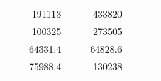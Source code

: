 \begin{table}[H]
\begin{tabular}{|ccrccrccc}
\multicolumn{1}{|c|}{\cellcolor[HTML]{FFFFC7}}                                & \multicolumn{1}{c|}{\cellcolor[HTML]{DDFDFF}}                      & \multicolumn{1}{r|}{\cellcolor[HTML]{DAE8FC}191113}    & \multicolumn{1}{c|}{\cellcolor[HTML]{FFFFC7}}                                & \multicolumn{1}{c|}{\cellcolor[HTML]{DDFDFF}}                       & \multicolumn{1}{r|}{\cellcolor[HTML]{DDFDFF}433820}    &                                                                              &                                                                    &                                                        \\ \cline{3-3} \cline{6-6}
\multicolumn{1}{|c|}{\cellcolor[HTML]{FFFFC7}}                                & \multicolumn{1}{c|}{\cellcolor[HTML]{DDFDFF}}                      & \multicolumn{1}{r|}{\cellcolor[HTML]{DDFDFF}100325}    & \multicolumn{1}{c|}{\cellcolor[HTML]{FFFFC7}}                                & \multicolumn{1}{c|}{\cellcolor[HTML]{DDFDFF}}                       & \multicolumn{1}{r|}{\cellcolor[HTML]{DAE8FC}273505}    &                                                                              &                                                                    &                                                        \\ \cline{3-3} \cline{6-6}
\multicolumn{1}{|c|}{\cellcolor[HTML]{FFFFC7}}                                & \multicolumn{1}{c|}{\cellcolor[HTML]{DDFDFF}}                      & \multicolumn{1}{r|}{\cellcolor[HTML]{DAE8FC}64331.4}   & \multicolumn{1}{c|}{\cellcolor[HTML]{FFFFC7}}                                & \multicolumn{1}{c|}{\cellcolor[HTML]{DDFDFF}}                       & \multicolumn{1}{r|}{\cellcolor[HTML]{DDFDFF}64828.6}   &                                                                              &                                                                    &                                                        \\ \cline{3-3} \cline{6-6}
\multicolumn{1}{|c|}{\cellcolor[HTML]{FFFFC7}}                                & \multicolumn{1}{c|}{\cellcolor[HTML]{DDFDFF}}                      & \multicolumn{1}{r|}{\cellcolor[HTML]{DDFDFF}75988.4}   & \multicolumn{1}{c|}{\cellcolor[HTML]{FFFFC7}}                                & \multicolumn{1}{c|}{\cellcolor[HTML]{DDFDFF}}                       & \multicolumn{1}{r|}{\cellcolor[HTML]{DAE8FC}130238}    &                                                                              &                                                                    &                                                        \\ \cline{3-3} \cline{6-6}

\end{tabular}
\end{table}
